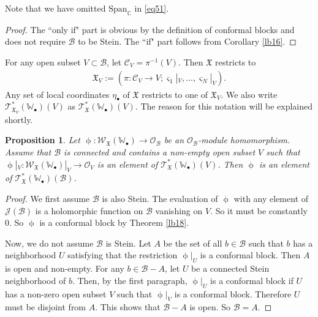 \documentclass[11pt,b5paper,notitlepage]{article}
\theoremstyle{definition}
\theoremstyle{plain}
\newtheorem{pp}[df]{Proposition}
\newcommand{\fk}{\mathfrak}
\newcommand{\mc}{\mathcal}
\newcommand{\Span}{\mathrm{Span}}
\newcommand{\scr}{\mathscr}
\newcommand{\sgm}{\varsigma}
\newcommand{\blt}{\bullet}
\newcommand{\Wbb}{\mathbb W}
\newcommand{\Cbb}{\mathbb C}
\numberwithin{equation}{section}
\begin{document}
Note that we have omitted $\Span_\Cbb$ in \eqref{eq51}.

\begin{proof}
The ``only if" part is obvious by the definition of conformal blocks and does not require $\mc B$ to be Stein. The ``if" part follows from Corollary \ref{lb16}.
\end{proof}




For any open subset $V\subset\mc B$, let $\mc C_V=\pi^{-1}(V)$. \index{CVXV@$\mc C_V,\fk X_V$} Then $\fk X$ restricts to
\begin{align*}
\fk X_V:=(\pi:\mc C_V\rightarrow V;\sgm_1|_V,\dots,\sgm_N|_V).
\end{align*}
Any set of local coordinates $\eta_\blt$ of $\fk X$ restricts to one of $\fk X_V$.  We also write $\scr T_{\fk X_V}^*(\Wbb_\blt)(V)$ as $\scr T_{\fk X}^*(\Wbb_\blt)(V)$. The reason for this notation will be explained shortly.





\begin{pp}\label{lb36}
Let $\upphi:\scr W_{\fk X}(\Wbb_\blt)\rightarrow\scr O_{\mc B}$ be an $\scr O_{\mc B}$-module homomorphism. Assume that $\mc B$ is connected and contains a non-empty open subset $V$ such that $\upphi|_V:\scr W_{\fk X}(\Wbb_\blt)|_V\rightarrow\scr O_V$ is an element of $\scr T_{\fk X}^*(\Wbb_\blt)(V)$. Then $\upphi$ is an element of $\scr T_{\fk X}^*(\Wbb_\blt)(\mc B)$.
\end{pp}

\begin{proof}
We first assume $\mc B$ is also Stein. The evaluation of $\upphi$ with any element of $\scr J(\mc B)$ is a holomorphic function on $\mc B$ vanishing on $V$. So it must be constantly $0$. So $\upphi$ is a conformal block by Theorem \ref{lb18}. 

Now, we do not assume $\mc B$ is Stein. Let $A$ be the set of all $b\in\mc B$ such that $b$ has a  neighborhood $U$ satisfying that the restriction $\upphi|_U$ is a conformal block. Then $A$ is open and  non-empty. For any $b\in\mc B-A$, let $U$ be a connected Stein neighborhood of $b$. Then, by the first paragraph, $\upphi|_U$ is a conformal block if $U$ has a non-zero open subset $V$ such that $\upphi|_V$ is a conformal block. Therefore $U$ must be disjoint from $A$. This shows that $\mc B-A$ is open. So $\mc B=A$.
\end{proof}
\end{document}
